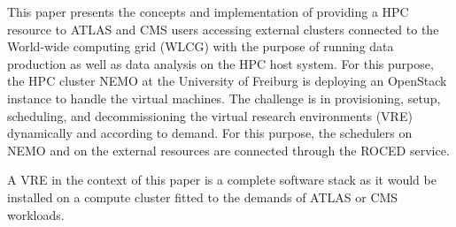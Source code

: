 This paper presents the concepts and implementation of providing a HPC resource
to ATLAS and CMS users accessing external clusters connected to the World-wide
computing grid (WLCG) with the purpose of running data production as well as
data analysis on the HPC host system.  For this purpose, the HPC cluster NEMO at
the University of Freiburg is deploying an OpenStack instance to handle the
virtual machines. The challenge is in provisioning, setup, scheduling, and decommissioning the virtual research environments (VRE) dynamically and according to demand. For this purpose, the schedulers on NEMO and on the external resources are
connected through the ROCED service\cite{ROCED}.

A VRE in the context of this paper is a complete software stack
as it would be installed on a compute cluster fitted to the demands of ATLAS or CMS workloads.

